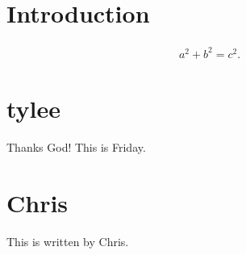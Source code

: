 \documentclass{article}
\begin{document}
\section{Introduction}

\begin{align}
    a^2 + b^2 = c^2 .
\end{align}


\section{tylee}

Thanks God! This is Friday.

\section{Chris}

This is written by Chris.
\end{document}
